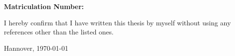 \clearpage

\thispagestyle{empty}
\mbox{ }

\clearpage   


\thispagestyle{empty}

\vspace*{10cm} 
\textbf{\name}\\
\textbf{Matriculation Number: \immatno}

\vspace*{2cm} I hereby confirm that I have written this thesis by myself without using any references other than the listed ones.\\

\vspace*{3cm}

Hannover, \today

\clearpage

\thispagestyle{empty}
\mbox{ }

\clearpage   

\selectfont
{}

\tableofcontents

\ifthispageodd{\clearpage\mbox{ }\thispagestyle{empty}}{\relax}

\setcounter{page}{0}


